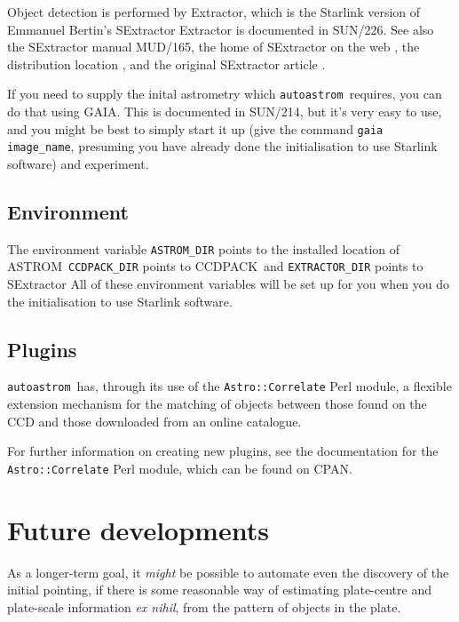 \documentclass[twoside,11pt]{article}
\newcommand{\htmladdnormallink}[2]{#1}
\newcommand{\xref}[3]{#1}
\newcommand{\xlabel}[1]{}
\newcommand{\ASTROM}{{\footnotesize ASTROM}\normalsize}
\newcommand{\autoastrom}{\texttt{autoastrom}}
\newcommand{\CCDPACKref}{\xref{{\footnotesize CCDPACK}}{sun139}{}}
\newcommand{\CPAN}{\htmladdnormallink{\footnotesize CPAN}{http://www.cpan.org/}}
\newcommand{\GAIA}{{\footnotesize GAIA}\normalsize}
\newcommand{\SExtractor}{\xref{{\footnotesize SExtractor}}{sun226}}
\begin{document}
Object detection is performed by Extractor, which is the Starlink version of
Emmanuel Bertin's \SExtractor. Extractor is documented in SUN/226. See also
the SExtractor manual MUD/165, the home of SExtractor on the web
\cite{sextractor-web}, the distribution location \cite{sextractor-ftp}, and
the original SExtractor article \cite{sextractor-article}.

If you need to supply the inital astrometry which \autoastrom\ requires, you
can do that using \GAIA. This is documented in SUN/214, but it's very easy to
use, and you might be best to simply start it up (give the command
\texttt{gaia image\_name}, presuming you have already done the initialisation
to use Starlink software) and experiment.

\subsection{\xlabel{sb_environment}Environment\label{sb:environment}}

The environment variable \texttt{ASTROM\_DIR} points to the installed location
of \ASTROM\, \texttt{CCDPACK\_DIR} points to \CCDPACKref\, and
\texttt{EXTRACTOR\_DIR} points to \SExtractor. All of these environment
variables will be set up for you when you do the initialisation to use
Starlink software.

\subsection{\xlabel{sb_plugins}Plugins\label{sb:plugins}}

\autoastrom\ has, through its use of the \texttt{Astro::Correlate} Perl
module, a flexible extension mechanism for the matching of objects between
those found on the CCD and those downloaded from an online catalogue.

For further information on creating new plugins, see the documentation for the
\texttt{Astro::Correlate} Perl module, which can be found on \CPAN.

\section{\xlabel{se_future}Future developments\label{se:future}}

As a longer-term goal, it \textit{might} be possible to automate even the
discovery of the initial pointing, if there is some reasonable way of
estimating plate-centre and plate-scale information \textit{ex nihil}, from
the pattern of objects in the plate.
\end{document}
